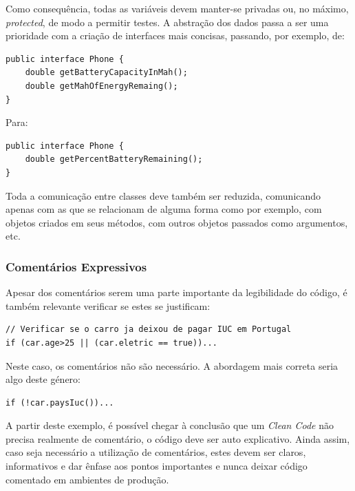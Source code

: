 \documentclass[10pt,portuguese]{article}
\begin{document}
\par Como consequência, todas as variáveis devem manter-se privadas ou, no máximo, \textit{protected}, de modo a permitir testes. A abstração dos dados passa a ser uma prioridade com a criação de interfaces mais concisas, passando, por exemplo, de:

\begin{lstlisting}
public interface Phone {
    double getBatteryCapacityInMah();
    double getMahOfEnergyRemaing();
}
\end{lstlisting}

\par Para:

\begin{lstlisting}
public interface Phone {
    double getPercentBatteryRemaining();
}
\end{lstlisting}

\par Toda a comunicação entre classes deve também ser reduzida, comunicando apenas com as que se relacionam de alguma forma como por exemplo, com objetos criados em seus métodos, com outros objetos passados como argumentos, etc.

\subsubsection{Comentários Expressivos}

\par Apesar dos comentários serem uma parte importante da legibilidade do código, é também relevante verificar se estes se justificam:


\begin{lstlisting}
// Verificar se o carro ja deixou de pagar IUC em Portugal
if (car.age>25 || (car.eletric == true))...
\end{lstlisting}

\par Neste caso, os comentários não são necessário. A abordagem mais correta seria algo deste género:

\begin{lstlisting}
if (!car.paysIuc())...
\end{lstlisting}

\Par A partir deste exemplo, é possível chegar à conclusão que um \textit{Clean Code} não precisa realmente de comentário, o código deve ser auto explicativo. Ainda assim, caso seja necessário a utilização de comentários, estes devem ser claros, informativos e dar ênfase aos pontos importantes e nunca deixar código comentado em ambientes de produção.
\end{document}
